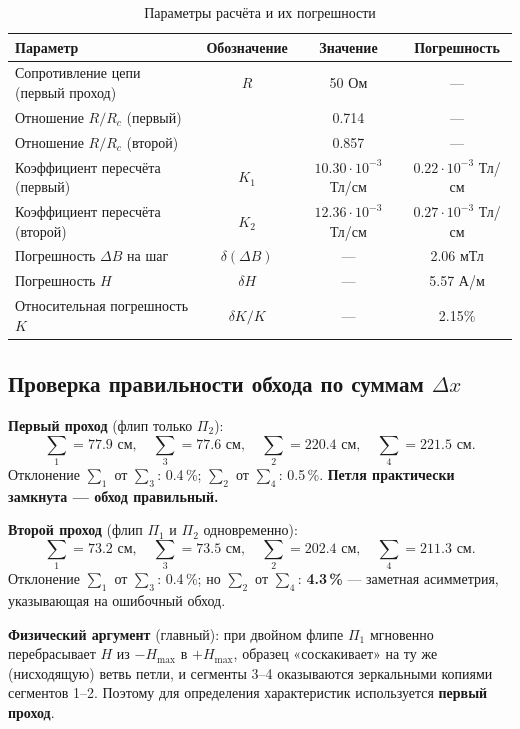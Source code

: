 \documentclass[a4paper]{article}
\begin{document}
	\begin{table}[h]
		\centering
		\caption{Параметры расчёта и их погрешности}
		\label{tab:numerical_params}
		\begin{tabular}{|l|c|c|c|}
			\hline
			Параметр & Обозначение & Значение & Погрешность \\
			\hline
			Сопротивление цепи (первый проход) & $R$ & 50 Ом & --- \\
			\hline
			Отношение $R/R_c$ (первый) & & 0.714 & --- \\
			\hline
			Отношение $R/R_c$ (второй) & & 0.857 & --- \\
			\hline
			Коэффициент пересчёта (первый) & $K_1$ & $10.30 \cdot 10^{-3}$ Тл/см & $0.22 \cdot 10^{-3}$ Тл/см \\
			\hline
			Коэффициент пересчёта (второй) & $K_2$ & $12.36 \cdot 10^{-3}$ Тл/см & $0.27 \cdot 10^{-3}$ Тл/см \\
			\hline
			Погрешность $\Delta B$ на шаг & $\delta(\Delta B)$ & --- & 2.06 мТл \\
			\hline
			Погрешность $H$ & $\delta H$ & --- & 5.57 А/м \\
			\hline
			Относительная погрешность $K$ & $\delta K/K$ & --- & 2.15\% \\
			\hline
		\end{tabular}
	\end{table}
	
	\subsection{Проверка правильности обхода по суммам $\Delta x$}
	
	\textbf{Первый проход} (флип только $\Pi_2$):
	\[
	\sum_1 = 77.9 \text{ см}, \quad \sum_3 = 77.6 \text{ см}, \quad
	\sum_2 = 220.4 \text{ см}, \quad \sum_4 = 221.5 \text{ см}.
	\]
	Отклонение $\sum_1$ от $\sum_3$: 0.4\,\%; $\sum_2$ от $\sum_4$: 0.5\,\%. \textbf{Петля практически замкнута — обход правильный.}
	
	\textbf{Второй проход} (флип $\Pi_1$ и $\Pi_2$ одновременно):
	\[
	\sum_1 = 73.2 \text{ см}, \quad \sum_3 = 73.5 \text{ см}, \quad
	\sum_2 = 202.4 \text{ см}, \quad \sum_4 = 211.3 \text{ см}.
	\]
	Отклонение $\sum_1$ от $\sum_3$: 0.4\,\%; но $\sum_2$ от $\sum_4$: \textbf{4.3\,\%} — заметная асимметрия, указывающая на ошибочный обход.
	
	\textbf{Физический аргумент} (главный): при двойном флипе $\Pi_1$ мгновенно перебрасывает $H$ из $-H_{\max}$ в $+H_{\max}$, образец «соскакивает» на ту же (нисходящую) ветвь петли, и сегменты 3--4 оказываются зеркальными копиями сегментов 1--2. Поэтому для определения характеристик используется \textbf{первый проход}.
	
\end{document}
